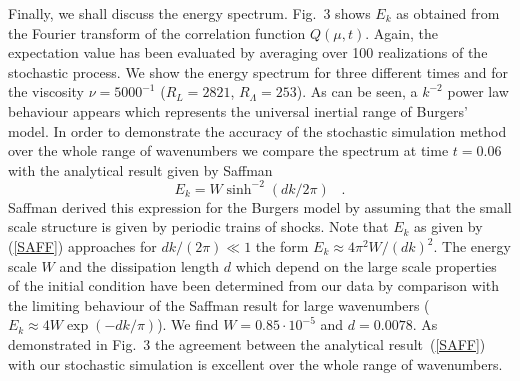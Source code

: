 Finally, we shall discuss the energy spectrum.
Fig.~3 shows $E_{k}$ as
obtained from the Fourier transform of the correlation
function $Q(\mu,t)$.
Again, the expectation value has been evaluated by averaging
over 100
realizations of the stochastic process. We show the energy
spectrum for
three different times and for the viscosity $\nu = 5000^{-1}$
($R_{L}= 2821$, $R_{\Lambda}= 253$). As can be seen,
a $k^{-2}$ power law behaviour appears which
represents the universal inertial range of Burgers' model.
In order to demonstrate the accuracy of the stochastic
simulation method
over the whole range of wavenumbers we compare the spectrum at time
$t=0.06$ with the analytical result given by Saffman\cite{SAFFMAN}
\begin{equation}        \label{SAFF}
E_{k} = W \sinh^{-2}(dk/2\pi) \;\;\; .
\end{equation}
Saffman derived this expression for the Burgers model by assuming
that
the small scale structure is given by periodic trains of shocks.
Note that
$E_{k}$ as given by (\ref{SAFF}) approaches for
$dk/(2 \pi) \ll 1$ the form
$E_{k} \approx 4\pi^2 W/(dk)^2$. The energy
scale $W$ and the dissipation length $d$ which depend on the
large scale properties of the initial condition have been
determined from
our data by comparison with the limiting behaviour of the
Saffman result
for large wavenumbers
($E_{k} \approx 4W \exp (-dk/\pi)$). We find
$W=0.85\cdot 10^{-5}$ and
$d=0.0078$. As demonstrated in Fig.~3 the agreement between the
analytical result~(\ref{SAFF}) with our stochastic simulation is
excellent over the whole range of wavenumbers.














